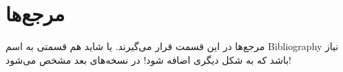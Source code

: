 \section{
مرجع‌ها
}

مرجع‌ها در این قسمت قرار می‌گیرند. یا شاید هم قسمتی به اسم 
Bibliography 
نیاز باشد که به شکل دیگری اضافه شود! در نسخه‌های بعد مشخص می‌شود!